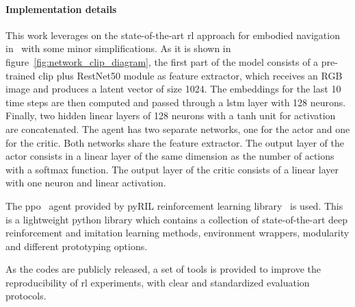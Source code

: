\paragraph*{Implementation details}
This work leverages on the state-of-the-art \acrshort{rl} approach for embodied navigation in~\cite{khandelwal2022} with some minor simplifications.
As it is shown in figure~\ref{fig:network_clip_diagram}, the first part of the model consists of a pre-trained \acrshort{clip} plus RestNet50 module as feature extractor, which receives an RGB image and produces a latent vector of size 1024.
The embeddings for the last 10 time steps are then computed and passed through a \acrshort{lstm} layer with 128 neurons.
Finally, two hidden linear layers of 128 neurons with a tanh unit for activation are concatenated.
The agent has two separate networks, one for the actor and one for the critic.
Both networks share the feature extractor.
The output layer of the actor consists in a linear layer of the same dimension as the number of actions with a softmax function.
The output layer of the critic consists of a linear layer with one neuron and linear activation.

The \acrshort{ppo}~\cite{schulman2017} agent provided by pyRIL reinforcement learning library~\cite{pyRIL} is used.
This is a lightweight python library which contains a collection of state-of-the-art deep reinforcement and imitation learning methods, environment wrappers, modularity and different prototyping options.

As the codes are publicly released, a set of tools is provided to improve the reproducibility of \acrshort{rl} experiments, with clear and standardized evaluation protocols.

